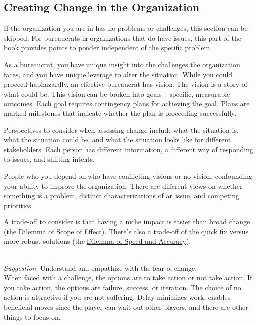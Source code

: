\subsection*{Creating Change in the Organization\label{sec:creating-change}}

If the organization you are in has no problems or challenges, this section can be skipped. For bureaucrats in organizations that do have issues, this part of the book provides points to ponder independent of the specific problem.

As a bureaucrat, you have unique insight into the challenges the organization faces, and you have unique leverage to alter the situation.  While you could proceed haphazardly, an effective bureaucrat has vision. The vision is a story of what-could-be. This vision can be broken into goals -- specific, measurable outcomes. Each goal requires contingency plans for achieving the goal. Plans are marked milestones that indicate whether the plan is proceeding successfully. 

Perspectives to consider when assessing change include what the situation is, what the situation could be, and what the situation looks like for different stakeholders. Each person has different information, a different way of responding to issues, and shifting intents.

People who you depend on who have conflicting visions or no vision, confounding your ability to improve the organization. There are different views on whether something is a problem, distinct characterizations of an issue, and competing priorities.

A trade-off to consider is that having a n\"iche impact is easier than broad change (the \hyperref[table:dilemma-personal-scope-broad-vs-narrow]{Dilemma of Scope of Effect}). 
%
There's also a trade-off of the quick fix versus more robust solutions (the \hyperref[table:dilemma-personal-quick-methodical]{Dilemma of Speed and Accuracy}).




\ \\
\textit{Suggestion}: Understand and empathize with the fear of change. \\
When faced with a challenge, the options are to take action or not take action. If you take action, the options are failure, success, or iteration. 
The choice of no action is attractive if you are not suffering. Delay minimizes work, enables beneficial moves since the player can wait out other players, and there are other things to focus on.

